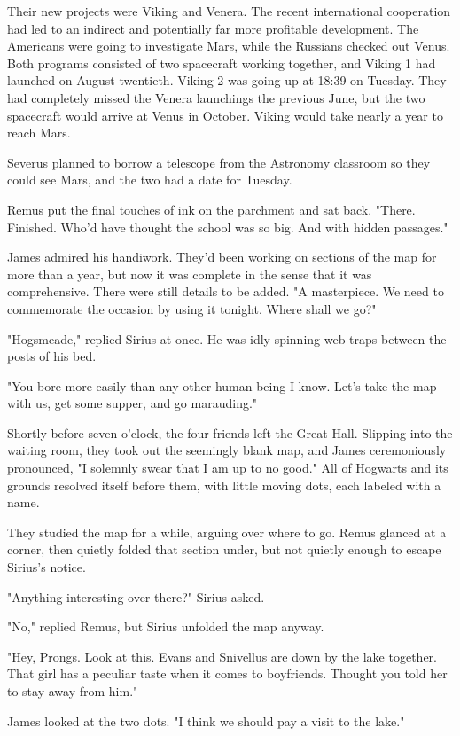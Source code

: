Their new projects were Viking and Venera. The recent international cooperation had led to an indirect and potentially far more profitable development. The Americans were going to investigate Mars, while the Russians checked out Venus. Both programs consisted of two spacecraft working together, and Viking 1 had launched on August twentieth. Viking 2 was going up at 18:39 on Tuesday. They had completely missed the Venera launchings the previous June, but the two spacecraft would arrive at Venus in October. Viking would take nearly a year to reach Mars.

Severus planned to borrow a telescope from the Astronomy classroom so they could see Mars, and the two had a date for Tuesday.

Remus put the final touches of ink on the parchment and sat back. "There. Finished. Who'd have thought the school was so big. And with hidden passages."

James admired his handiwork. They'd been working on sections of the map for more than a year, but now it was complete in the sense that it was comprehensive. There were still details to be added. "A masterpiece. We need to commemorate the occasion by using it tonight. Where shall we go?"

"Hogsmeade," replied Sirius at once. He was idly spinning web traps between the posts of his bed.

"You bore more easily than any other human being I know. Let's take the map with us, get some supper, and go marauding."

Shortly before seven o'clock, the four friends left the Great Hall. Slipping into the waiting room, they took out the seemingly blank map, and James ceremoniously pronounced, "I solemnly swear that I am up to no good." All of Hogwarts and its grounds resolved itself before them, with little moving dots, each labeled with a name.

They studied the map for a while, arguing over where to go. Remus glanced at a corner, then quietly folded that section under, but not quietly enough to escape Sirius's notice.

"Anything interesting over there?" Sirius asked.

"No," replied Remus, but Sirius unfolded the map anyway.

"Hey, Prongs. Look at this. Evans and Snivellus are down by the lake together. That girl has a peculiar taste when it comes to boyfriends. Thought you told her to stay away from him."

James looked at the two dots. "I think we should pay a visit to the lake."

